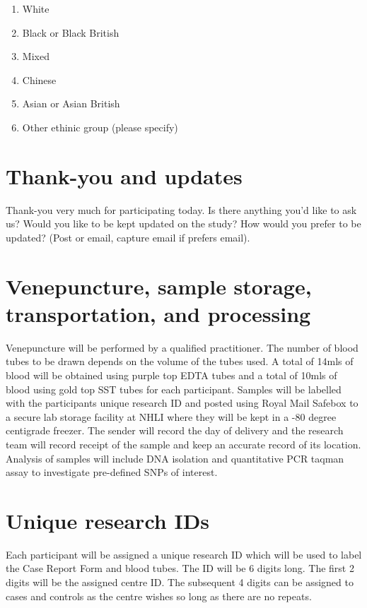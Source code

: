 \documentclass[a4paper,10pt]{article}
\begin{document}
\begin{enumerate}
\item White
\item Black or Black British
\item Mixed
\item Chinese
\item Asian or Asian British
\item Other ethinic group (please specify)
\end{enumerate}

\section{Thank-you and updates}
Thank-you very much for participating today. Is there anything you'd like to ask us? Would you like to be kept updated on the study? How would you prefer to be updated? 
(Post or email, capture email if prefers email).


\section{Venepuncture, sample storage, transportation, and processing} 

Venepuncture will be performed by a qualified practitioner. The number of blood tubes to be drawn depends on the volume of the tubes used. A total of 14mls of blood will be obtained using purple top EDTA tubes and a total of 10mls of blood using gold top SST tubes for each participant. Samples will be labelled with the participants unique research ID and posted using Royal Mail Safebox to a secure lab storage facility at NHLI where they will be kept in a -80 degree centigrade freezer.
The sender will record the day of delivery and the research team will record receipt of the sample and keep an accurate record of its location. Analysis of samples will include DNA isolation and quantitative PCR taqman assay to investigate pre-defined SNPs of interest.

\section{Unique research IDs}

Each participant will be assigned a unique research ID which will be used to label the Case Report Form and blood tubes. The ID will be 6 digits long. The first 2 digits will be the assigned centre ID. The subsequent 4 digits can be assigned to cases and controls as the centre wishes so long as there are no repeats.
\end{document}
